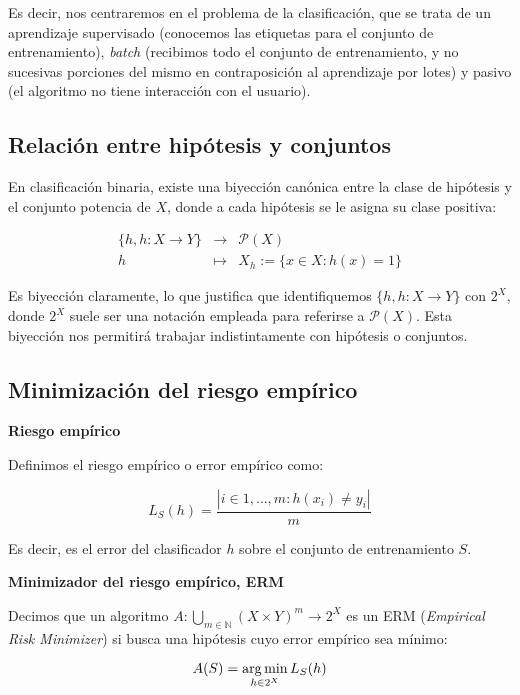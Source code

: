 Es decir, nos centraremos en el problema de la clasificación, que se trata de un aprendizaje supervisado (conocemos las etiquetas para
el conjunto de entrenamiento), \emph{batch} (recibimos todo el conjunto de entrenamiento, y no sucesivas porciones del mismo en
contraposición al aprendizaje por lotes) y pasivo (el algoritmo no tiene interacción con el usuario).

\subsection{Relación entre hipótesis y conjuntos}
En clasificación binaria, existe una biyección canónica entre la clase de hipótesis y el conjunto potencia de $X$, donde
a cada hipótesis se le asigna su clase positiva:

\[\begin{array}{rcl} 
  \{h, h:X \rightarrow Y\} & \longrightarrow & \mathcal{P}(X) \\
  h & \longmapsto & X_h := \{x\in X: h(x) = 1\}
 \end{array}\]

Es biyección claramente, lo que justifica que identifiquemos $\{h, h:X \rightarrow Y\}$ con $2^X$, donde $2^X$ suele ser una notación
empleada para referirse a $\mathcal{P}(X)$. Esta biyección nos permitirá trabajar indistintamente con hipótesis o conjuntos.

\subsection{Minimización del riesgo empírico}

\begin{definition*} \textbf{Riesgo empírico}

Definimos el riesgo empírico o error empírico como:

\[L_S(h) = \frac{|i\in {1,\ldots, m}: h(x_i) \neq y_i|}{m}\]

\end{definition*}

Es decir, es el error del clasificador $h$ sobre el conjunto de entrenamiento $S$. 

\begin{definition*} \textbf{Minimizador del riesgo empírico, ERM}

Decimos que un algoritmo $A: \underset{m\in \mathbb{N}}{\bigcup} (X\times Y)^m \rightarrow 2^{X}$ es un ERM 
(\emph{Empirical Risk Minimizer}) si busca una hipótesis cuyo error empírico sea mínimo:

\[A(S) = \operatorname*{arg\,min}_{h\in 2^X} L_S(h)\]
\end{definition*}

